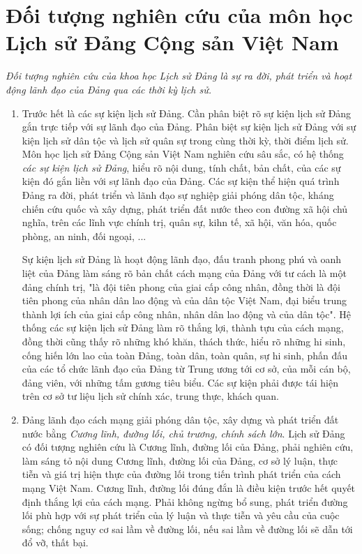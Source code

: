 \section{Đối tượng nghiên cứu của môn học Lịch sử Đảng Cộng sản Việt Nam}
\textit{Đối tượng nghiên cứu của khoa học Lịch sử Đảng là sự ra đời, phát triển và hoạt động lãnh đạo của Đảng qua các thời kỳ lịch sử.}

\begin{enumerate}
\item Trước hết là các sự kiện lịch sử Đảng. Cần phân biệt rõ sự kiện lịch sử Đảng gắn trực tiếp với sự lãnh đạo của Đảng. Phân biệt sự kiện lịch sử Đảng với sự kiện lịch sử dân tộc và lịch sử quân sự trong cùng thời kỳ, thời điểm lịch sử. Môn học lịch sử Đảng Cộng sản Việt Nam nghiên cứu sâu sắc, có hệ thống \textit{các sự kiện lịch sử Đảng}, hiểu rõ nội dung, tính chất, bản chất, của các sự kiện đó gắn liền với sự lãnh đạo của Đảng. Các sự kiện thể hiện quá trình Đảng ra đời, phát triển và lãnh đạo sự nghiệp giải phóng dân tộc, kháng chiến cứu quốc và xây dựng, phát triển đất nước theo con đường xã hội chủ nghĩa, trên các lĩnh vực chính trị, quân sự, kihn tế, xã hội, văn hóa, quốc phòng, an ninh, đối ngoại, ...

Sự kiện lịch sử Đảng là hoạt động lãnh đạo, đấu tranh phong phú và oanh liệt của Đảng làm sáng rõ bản chất cách mạng của Đảng với tư cách là một đảng chính trị, "là đội tiên phong của giai cấp công nhân, đồng thời là đội tiên phong của nhân dân lao động và của dân tộc Việt Nam, đại biểu trung thành lợi ích của giai cấp công nhân, nhân dân lao động và của dân tộc". Hệ thống các sự kiện lịch sử Đảng làm rõ thắng lợi, thành tựu của cách mạng, đồng thời cũng thấy rõ những khó khăn, thách thức, hiểu rõ những hi sinh, cống hiến lớn lao của toàn Đảng, toàn dân, toàn quân, sự hi sinh, phấn đấu của các tổ chức lãnh đạo của Đảng từ Trung ương tới cơ sở, của mỗi cán bộ, đảng viên, với những tấm gương tiêu biểu. Các sự kiện phải được tái hiện trên cơ sở tư liệu lịch sử chính xác, trung thực, khách quan.
\item Đảng lãnh đạo cách mạng giải phóng dân tộc, xây dựng và phát triển đất nước bằng \textit{Cương lĩnh, đường lối, chủ trương, chính sách lớn}. Lịch sử Đảng có đối tượng nghiên cứu là Cương lĩnh, đường lối của Đảng, phải nghiên cứu, làm sáng tỏ nội dung Cương lĩnh, đường lối của Đảng, cơ sở lý luận, thực tiễn và giá trị hiện thực của đường lối trong tiến trình phát triển của cách mạng Việt Nam. Cương lĩnh, đường lối đúng đắn là điều kiện trước hết quyết định thắng lợi của cách mạng. Phải không ngừng bổ sung, phát triển đường lối phù hợp với sự phát triển của lý luận và thực tiễn và yêu cầu của cuộc sống; chống nguy cơ sai lầm về đường lối, nếu sai lầm về đường lối sẽ dẫn tới đổ vỡ, thất bại.


\end{enumerate}

